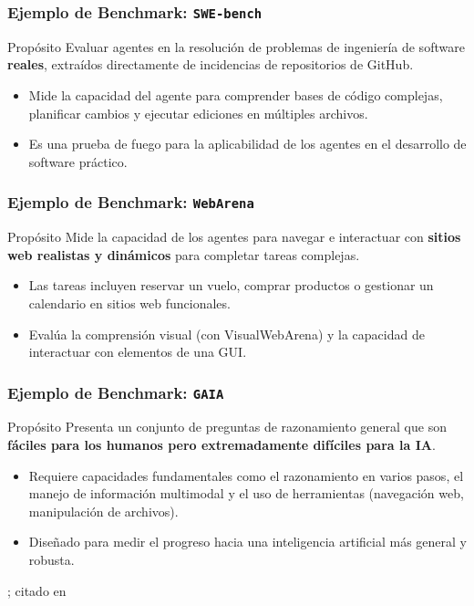 \documentclass[handout]{beamer}
\begin{document}
\begin{frame}
    \frametitle{Ejemplo de Benchmark: \texttt{SWE-bench}}
    \begin{exampleblock}{Propósito}
    Evaluar agentes en la resolución de problemas de ingeniería de software \textbf{reales}, extraídos directamente de incidencias de repositorios de GitHub.
    \end{exampleblock}
    \begin{itemize}
        \item Mide la capacidad del agente para comprender bases de código complejas, planificar cambios y ejecutar ediciones en múltiples archivos.
        \item Es una prueba de fuego para la aplicabilidad de los agentes en el desarrollo de software práctico.
    \end{itemize}
    \raggedleft\footnotesize{\parencite{jimenez2023swebench, yehudai2025surveyevaluationllmbasedagents}}
\end{frame}

\begin{frame}
    \frametitle{Ejemplo de Benchmark: \texttt{WebArena}}
     \begin{exampleblock}{Propósito}
    Mide la capacidad de los agentes para navegar e interactuar con \textbf{sitios web realistas y dinámicos} para completar tareas complejas.
    \end{exampleblock}
    \begin{itemize}
        \item Las tareas incluyen reservar un vuelo, comprar productos o gestionar un calendario en sitios web funcionales.
        \item Evalúa la comprensión visual (con VisualWebArena) y la capacidad de interactuar con elementos de una GUI.
    \end{itemize}
    \raggedleft\footnotesize{\parencite{zhou2023webarena, yehudai2025surveyevaluationllmbasedagents}}
\end{frame}

\begin{frame}
    \frametitle{Ejemplo de Benchmark: \texttt{GAIA}}
     \begin{exampleblock}{Propósito}
    Presenta un conjunto de preguntas de razonamiento general que son \textbf{fáciles para los humanos pero extremadamente difíciles para la IA}.
    \end{exampleblock}
    \begin{itemize}
        \item Requiere capacidades fundamentales como el razonamiento en varios pasos, el manejo de información multimodal y el uso de herramientas (navegación web, manipulación de archivos).
        \item Diseñado para medir el progreso hacia una inteligencia artificial más general y robusta.
    \end{itemize}
    \raggedleft\footnotesize{\parencite{mialon2023gaia}; citado en \textcite{yehudai2025surveyevaluationllmbasedagents}}
\end{frame}
\end{document}
